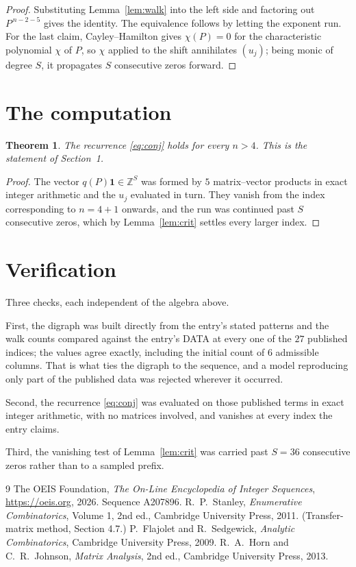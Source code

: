 \documentclass[11pt,a4paper]{article}
\theoremstyle{plain}
\newtheorem{theorem}{Theorem}
\theoremstyle{definition}
\begin{document}
\begin{proof}
Substituting Lemma~\ref{lem:walk} into the left side and factoring out
$P^{\,n-2-5}$ gives the identity. The equivalence follows by letting the exponent
run. For the last claim, Cayley--Hamilton gives $\chi(P)=0$ for the characteristic
polynomial $\chi$ of $P$, so $\chi$ applied to the shift annihilates $(u_j)$; being monic of
degree $S$, it propagates $S$ consecutive zeros forward.
\end{proof}

\section{The computation}

\begin{theorem}
The recurrence \eqref{eq:conj} holds for every $n>4$. This is the statement of
Section~1.
\end{theorem}

\begin{proof}
The vector $q(P)\mathbf{1}\in\mathbb{Z}^{S}$ was formed by $5$ matrix--vector
products in exact integer arithmetic and the $u_j$ evaluated in turn. They vanish from the
index corresponding to $n=4+1$ onwards, and the run was continued past $S$ consecutive
zeros, which by Lemma~\ref{lem:crit} settles every larger index.
\end{proof}

\section{Verification}

Three checks, each independent of the algebra above.

First, the digraph was built directly from the entry's stated patterns and the walk counts
compared against the entry's DATA at every one of the $27$ published indices; the
values agree exactly, including the initial count of $6$ admissible columns. That is
what ties the digraph to the sequence, and a model reproducing only part of the published
data was rejected wherever it occurred.

Second, the recurrence \eqref{eq:conj} was evaluated on those published terms in exact
integer arithmetic, with no matrices involved, and vanishes at every index the entry claims.

Third, the vanishing test of Lemma~\ref{lem:crit} was carried past $S=36$ consecutive
zeros rather than to a sampled prefix.

\begin{thebibliography}{9}
 The OEIS Foundation, \emph{The On-Line Encyclopedia of Integer
Sequences}, \url{https://oeis.org}, 2026. Sequence A207896.
 R.~P.~Stanley, \emph{Enumerative Combinatorics}, Volume 1, 2nd ed.,
Cambridge University Press, 2011. (Transfer-matrix method, Section 4.7.)
 P.~Flajolet and R.~Sedgewick, \emph{Analytic Combinatorics}, Cambridge
University Press, 2009.
 R.~A.~Horn and C.~R.~Johnson, \emph{Matrix Analysis}, 2nd ed., Cambridge
University Press, 2013.
\end{thebibliography}
\end{document}
